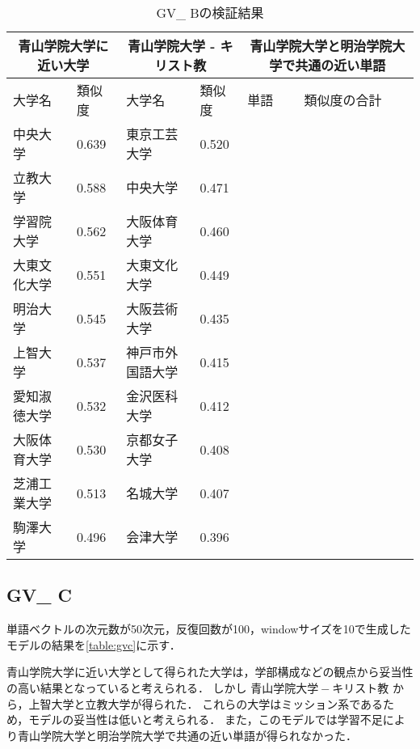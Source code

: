 \begin{table}[H]
\caption{GV\_ Bの検証結果}
\centering
\footnotesize
\begin{tabular}{ll|ll|ll}
\hline
\multicolumn{2}{c}{青山学院大学に近い大学} & \multicolumn{2}{c}{青山学院大学 - キリスト教} & \multicolumn{2}{c}{青山学院大学と明治学院大学で共通の近い単語}
\\ \hline
大学名 & 類似度 & 大学名 & 類似度 & 単語 & 類似度の合計
\\ \hline \hline
中央大学 & 0.639 & 東京工芸大学 & 0.520 & & \\
立教大学 & 0.588 & 中央大学 & 0.471 & & \\
学習院大学 & 0.562 & 大阪体育大学 & 0.460 & & \\
大東文化大学 & 0.551 & 大東文化大学 & 0.449 & & \\
明治大学 & 0.545 & 大阪芸術大学 & 0.435 & & \\
上智大学 & 0.537 & 神戸市外国語大学 & 0.415 & & \\
愛知淑徳大学 & 0.532 & 金沢医科大学 & 0.412 & & \\
大阪体育大学 & 0.530 & 京都女子大学 & 0.408 & & \\
芝浦工業大学 & 0.513 & 名城大学 & 0.407 & & \\
駒澤大学 & 0.496 & 会津大学 & 0.396 & & \\ \hline
\end{tabular}
\label{table:gvb}
\end{table}

\subsection{GV\_ C}
単語ベクトルの次元数が50次元，反復回数が100，windowサイズを10で生成したモデルの結果を\ref{table:gvc}に示す．

青山学院大学に近い大学として得られた大学は，学部構成などの観点から妥当性の高い結果となっていると考えられる．
しかし $ 青山学院大学 - キリスト教 $ から，上智大学と立教大学が得られた．
これらの大学はミッション系であるため，モデルの妥当性は低いと考えられる．
また，このモデルでは学習不足により青山学院大学と明治学院大学で共通の近い単語が得られなかった．

